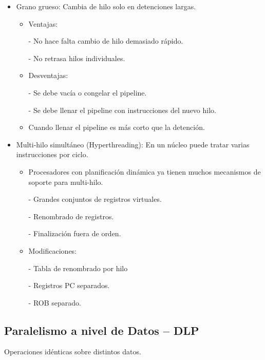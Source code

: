 \documentclass[12pt, twoside, openright]{report} %
\begin{document}
\begin{itemize}
\begin{itemize}
\begin{itemize}
			            \item Grano grueso: Cambia de hilo solo en detenciones largas.
			                  \begin{itemize}
				                  \item Ventajas:

				                        - No hace falta cambio de hilo demasiado rápido.

				                        - No retrasa hilos individuales.
				                  \item Desventajas:

				                        - Se debe vacía o congelar el pipeline.

				                        - Se debe llenar el pipeline con instrucciones del nuevo hilo.
				                  \item Cuando llenar el pipeline es más corto que la detención.
			                  \end{itemize}

			            \item Multi-hilo simultáneo (Hyperthreading): En un núcleo puede tratar varias instrucciones por ciclo.
			                  \begin{itemize}
				                  \item Procesadores con planificación dinámica ya tienen muchos mecanismos de soporte para multi-hilo.

				                        - Grandes conjuntos de registros virtuales.

				                        - Renombrado de registros.

				                        - Finalización fuera de orden.
				                  \item Modificaciones:

				                        - Tabla de renombrado por hilo

				                        - Registros PC separados.

				                        - ROB separado.
			                  \end{itemize}

		            \end{itemize}
	      \end{itemize}
\end{itemize}
\subsection{Paralelismo a nivel de Datos -- DLP}
Operaciones idénticas sobre distintos datos.
\end{document}
